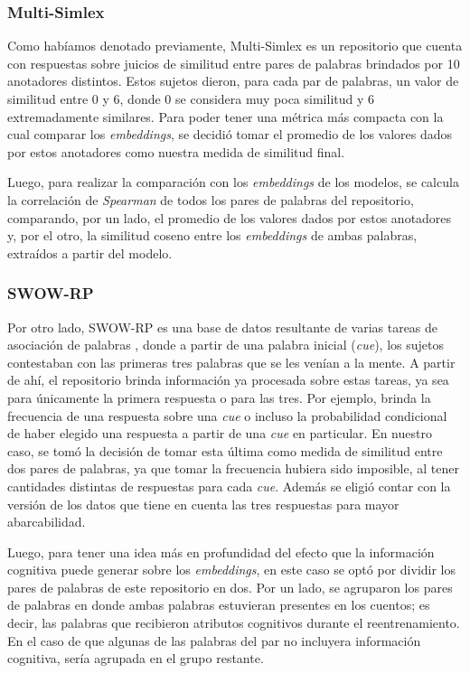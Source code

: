 \subsubsection{Multi-Simlex}

Como habíamos denotado previamente, Multi-Simlex es un repositorio que cuenta con respuestas 
sobre juicios de similitud entre pares de palabras brindados por 10 anotadores distintos. 
Estos sujetos dieron, para cada par de palabras, un valor de similitud entre $0$ y $6$, donde $0$ 
se considera muy poca similitud y $6$ extremadamente similares. Para poder tener una métrica 
más compacta con la cual comparar los \textit{embeddings}, se decidió tomar el promedio de los valores 
dados por estos anotadores como nuestra medida de similitud final.

Luego, para realizar la comparación con los \textit{embeddings} de los modelos, se calcula la correlación 
de \textit{Spearman} de todos los pares de palabras del repositorio, comparando, por un lado, el promedio 
de los valores dados por estos anotadores y, por el otro, la similitud coseno entre los 
\textit{embeddings} de ambas palabras, extraídos a partir del modelo.

\subsubsection{SWOW-RP}

Por otro lado, SWOW-RP es una base de datos resultante de varias tareas de asociación de palabras , 
donde a partir de una palabra inicial (\textit{cue}), los sujetos contestaban con las primeras tres 
palabras que se les venían a la mente.  A partir de ahí, el repositorio brinda información ya procesada sobre estas tareas, ya sea 
para únicamente la primera respuesta o para las tres. Por ejemplo, brinda la frecuencia de 
una respuesta sobre una \textit{cue} o incluso la probabilidad condicional de haber elegido una 
respuesta a partir de una \textit{cue} en particular. En nuestro caso, se tomó la decisión de tomar 
esta última como medida de similitud entre dos pares de palabras, ya que tomar la frecuencia 
hubiera sido imposible, al tener cantidades distintas de respuestas para cada \textit{cue}. Además se 
eligió contar con la versión de los datos que tiene en cuenta las tres respuestas para mayor 
abarcabilidad.

Luego, para tener una idea más en profundidad del efecto que la información cognitiva puede 
generar sobre los \textit{embeddings}, en este caso se optó por dividir los pares de palabras de este 
repositorio en dos. Por un lado, se agruparon los pares de palabras en donde ambas palabras 
estuvieran presentes en los cuentos; es decir, las palabras que recibieron atributos cognitivos 
durante el reentrenamiento. En el caso de que algunas de las palabras del par no incluyera 
información cognitiva, sería agrupada en el grupo restante.

